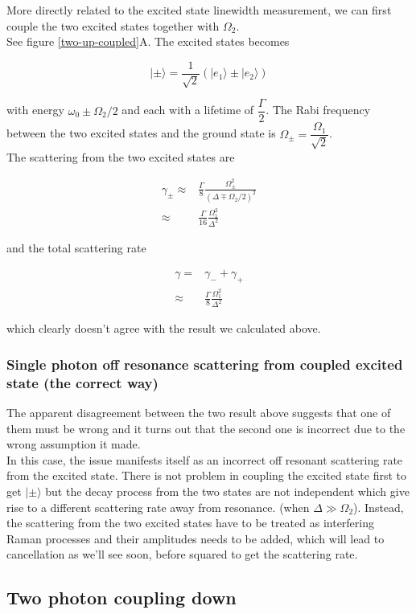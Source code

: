 \documentclass[10pt,fleqn]{article}
\newcommand{\eqar}[1]
{
  \begin{align*}
    #1
  \end{align*}
}
\newcommand{\paren}[1]{{\left({#1}\right)}}
\begin{document}
More directly related to the excited state linewidth measurement, we can first couple the
two excited states together with $\Omega_2$.\\

See figure \ref{two-up-coupled}A. The excited states becomes

\[|\pm\rangle=\frac{1}{\sqrt2}\paren{|e_1\rangle\pm|e_2\rangle}\]

with energy $\omega_0\pm\Omega_2/2$ and each with a lifetime of $\dfrac\Gamma2$.
The Rabi frequency between the two excited states and the ground state is
$\Omega_\pm=\dfrac{\Omega_1}{\sqrt2}$.\\
The scattering from the two excited states are
\eqar{
  \gamma_\pm\approx&\frac{\Gamma}{8}\frac{\Omega_\pm^2}{\paren{\Delta\mp\Omega_2/2}^2}\\
  \approx&\frac{\Gamma}{16}\frac{\Omega_1^2}{\Delta^2}
}
and the total scattering rate
\eqar{
  \gamma=&\gamma_-+\gamma_+\\
  \approx&\frac{\Gamma}{8}\frac{\Omega_1^2}{\Delta^2}
}
which clearly doesn't agree with the result we calculated above.

\subsubsection{Single photon off resonance scattering from coupled excited state
  (the correct way)}

The apparent disagreement between the two result above suggests that one of them must be wrong
and it turns out that the second one is incorrect due to the wrong assumption it made.\\

In this case, the issue manifests itself as an incorrect off resonant scattering rate
from the excited state. There is not problem in coupling the excited state first to get
$|\pm\rangle$ but the decay process from the two states are not independent which give rise
to a different scattering rate away from resonance. (when $\Delta\gg\Omega_2$).
Instead, the scattering from the two excited states have to be treated as interfering
Raman processes and their amplitudes needs to be added, which will lead to cancellation
as we'll see soon, before squared to get the scattering rate.\\

\subsection{Two photon coupling down}

\end{document}
